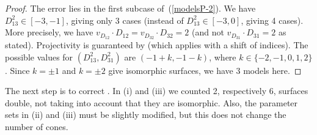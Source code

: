 \documentclass[11pt]{amsart}
\numberwithin{equation}{section}
\theoremstyle{plain}
\theoremstyle{remark}
\begin{document}
\begin{proof}
The error lies in the first subcase of~(\ref{modelsP-2}). We have $D_{13}^2\in [-3,-1]$, giving only 3 cases (instead of $D_{13}^2\in [-3,0]$, giving 4 cases). More precisely, we have $v_{D_{12}} \cdot D_{12}=v_{D_{32}}\cdot D_{32}=2$ (and not $v_{D_{31}}\cdot D_{31}=2$ as stated). Projectivity is guaranteed by \cite[Proposition 5.3(i)]{HL22} (which applies with a shift of indices).  The possible values for $(D_{13}^2,D_{31}^2)$ are $(-1+k,-1-k)$, where $k \in \{-2,-1,0,1,2\}$. Since $k= \pm 1$ and $k=\pm 2$ give isomorphic surfaces, we have 3 models here.
\end{proof}

The next step is to correct \cite[Theorem 7.12]{HL22}. In (i) and (iii) we counted 2, respectively 6, surfaces double, not taking into account that they are isomorphic.  Also, the parameter sets in (ii) and (iii) must be slightly modified, but this does not change the number of cones.
\end{document}
